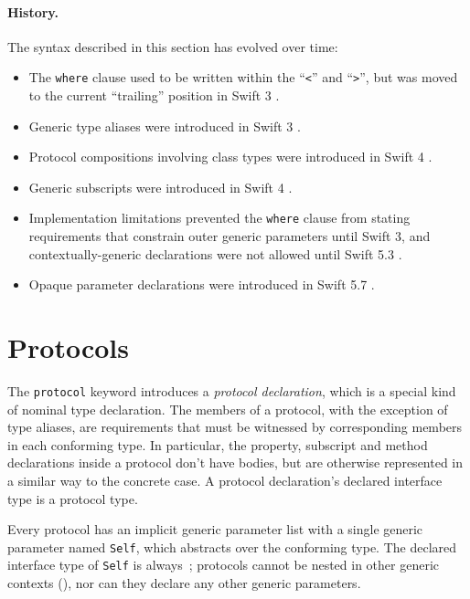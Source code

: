 \documentclass[../generics]{subfiles}
\begin{document}
\paragraph{History.} The syntax described in this section has evolved over time:
\begin{itemize}
\item The \texttt{where} clause used to be written within the ``\texttt{<}'' and ``\texttt{>}'', but was moved to the current ``trailing'' position in Swift 3 \cite{se0081}.
\item Generic type aliases were introduced in Swift 3 \cite{se0048}.
\item Protocol compositions involving class types were introduced in Swift 4 \cite{se0156}.
\item Generic subscripts were introduced in Swift 4 \cite{se0148}.
\item Implementation limitations prevented the \texttt{where} clause from stating requirements that constrain outer generic parameters until Swift 3, and contextually-generic declarations were not allowed until Swift 5.3 \cite{se0261}.
\item Opaque parameter declarations were introduced in Swift 5.7 \cite{se0341}.
\end{itemize}

\section{Protocols}\label{protocols}

The \texttt{protocol} keyword introduces a \emph{protocol declaration}, which is a special kind of nominal type declaration. The members of a protocol, with the exception of type aliases, are requirements that must be witnessed by corresponding members in each conforming type. In particular, the property, subscript and method declarations inside a protocol don't have bodies, but are otherwise represented in a similar way to the concrete case. A protocol declaration's declared interface type is a protocol type.

Every protocol has an implicit generic parameter list with a single generic parameter named \texttt{Self}, which abstracts over the conforming type. The declared interface type of \texttt{Self} is always~\rT; protocols cannot be nested in other generic contexts (), nor can they declare any other generic parameters.
\end{document}
